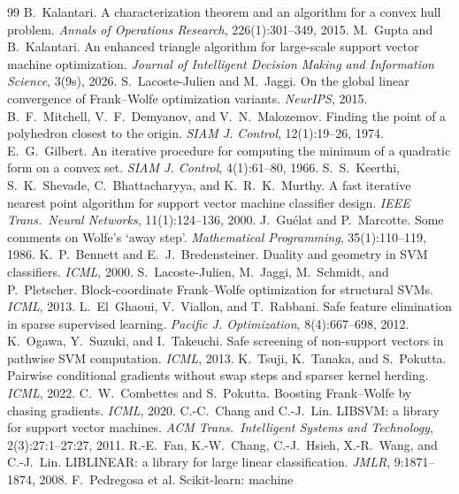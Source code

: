\documentclass{opt2026}   %
\begin{document}
\begin{thebibliography}{99}
 B.~Kalantari. A characterization theorem and an
algorithm for a convex hull problem. \emph{Annals of Operations
Research}, 226(1):301--349, 2015.
 M.~Gupta and B.~Kalantari. An enhanced triangle
algorithm for large-scale support vector machine optimization.
\emph{Journal of Intelligent Decision Making and Information Science},
3(9s), 2026.
 S.~Lacoste-Julien and M.~Jaggi. On the global linear
convergence of Frank--Wolfe optimization variants. \emph{NeurIPS}, 2015.
 B.~F.~Mitchell, V.~F.~Demyanov, and V.~N.~Malozemov.
Finding the point of a polyhedron closest to the origin. \emph{SIAM J.
Control}, 12(1):19--26, 1974.
 E.~G.~Gilbert. An iterative procedure for
computing the minimum of a quadratic form on a convex set. \emph{SIAM J.
Control}, 4(1):61--80, 1966.
 S.~S.~Keerthi, S.~K.~Shevade, C.~Bhattacharyya,
and K.~R.~K.~Murthy. A fast iterative nearest point algorithm for
support vector machine classifier design. \emph{IEEE Trans.\ Neural
Networks}, 11(1):124--136, 2000.
 J.~Gu\'elat and P.~Marcotte. Some comments on
Wolfe's `away step'. \emph{Mathematical Programming}, 35(1):110--119, 1986.
 K.~P.~Bennett and E.~J.~Bredensteiner.
Duality and geometry in SVM classifiers. \emph{ICML}, 2000.
 S.~Lacoste-Julien, M.~Jaggi, M.~Schmidt, and
P.~Pletscher. Block-coordinate Frank--Wolfe optimization for structural
SVMs. \emph{ICML}, 2013.
 L.~El~Ghaoui, V.~Viallon, and T.~Rabbani. Safe
feature elimination in sparse supervised learning. \emph{Pacific J.
Optimization}, 8(4):667--698, 2012.
 K.~Ogawa, Y.~Suzuki, and I.~Takeuchi. Safe screening
of non-support vectors in pathwise SVM computation. \emph{ICML}, 2013.
 K.~Tsuji, K.~Tanaka, and S.~Pokutta. Pairwise
conditional gradients without swap steps and sparser kernel herding.
\emph{ICML}, 2022.
 C.~W.~Combettes and S.~Pokutta. Boosting
Frank--Wolfe by chasing gradients. \emph{ICML}, 2020.
 C.-C.~Chang and C.-J.~Lin. {LIBSVM}: a library for
support vector machines. \emph{ACM Trans.\ Intelligent Systems and
Technology}, 2(3):27:1--27:27, 2011.
 R.-E.~Fan, K.-W.~Chang, C.-J.~Hsieh, X.-R.~Wang, and
C.-J.~Lin. {LIBLINEAR}: a library for large linear classification.
\emph{JMLR}, 9:1871--1874, 2008.
 F.~Pedregosa et al. Scikit-learn: machine

\end{thebibliography}
\end{document}
